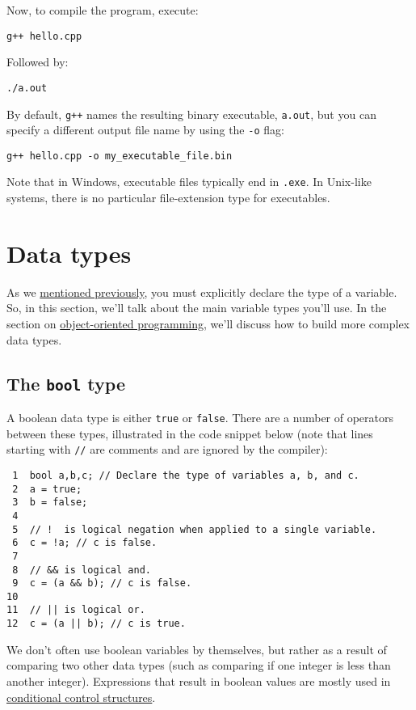 \documentclass[11pt]{article}
\begin{document}
Now, to compile the program, execute:

\begin{verbatim}
g++ hello.cpp
\end{verbatim}

Followed by:
\begin{verbatim}
./a.out
\end{verbatim}

By default, \texttt{g++} names the resulting binary executable, \texttt{a.out}, but
you can specify a different output file name by using the \texttt{-o} flag:

\begin{verbatim}
g++ hello.cpp -o my_executable_file.bin
\end{verbatim}

Note that in Windows, executable files typically end in \texttt{.exe}. In Unix-like
systems, there is no particular file-extension type for executables.

\section{Data types}
\label{sec:orgheadline24}
As we \hyperref[sec:orgheadline1]{mentioned previously}, you must explicitly declare the type of a 
variable. So, in this section, we'll talk about the main variable 
types you'll use. In the section on \hyperref[sec:orgheadline9]{object-oriented programming}, 
we'll discuss how to build more complex data types.

\subsection{The \texttt{bool} type}
\label{sec:orgheadline11}
A boolean data type is either \texttt{true} or \texttt{false}. There are a number of 
operators between these types, illustrated in the code snippet below 
(note that lines starting with \texttt{//} are comments and are ignored by the 
compiler):

\begin{verbatim}
 1  bool a,b,c; // Declare the type of variables a, b, and c.
 2  a = true;
 3  b = false;
 4  
 5  // !  is logical negation when applied to a single variable.
 6  c = !a; // c is false.
 7  
 8  // && is logical and.
 9  c = (a && b); // c is false.
10  
11  // || is logical or.
12  c = (a || b); // c is true.
\end{verbatim}

We don't often use boolean variables by themselves, but rather as a result 
of comparing two other data types (such as comparing if one integer is less 
than another integer). Expressions that result in boolean values are mostly 
used in \hyperref[sec:orgheadline10]{conditional control structures}.
\end{document}
